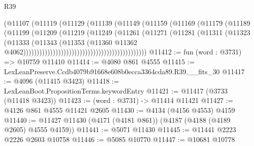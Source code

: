\begin{lexlean}{R39}
\begin{coremodule}
                                                    (@11107
                                                      (@11119
                                                        (@11129
                                                          (@11139
                                                            (@11149
                                                              (@11159
                                                                (@11169
                                                                  (@11179
                                                                    (@11189
                                                                      (@11199
                                                                        (@11209
                                                                          (@11219
                                                                            (@11249
                                                                              (@11261
                                                                                (@11271
                                                                                  (@11281
                                                                                    (@11311
                                                                                      (@11323
                                                                                        (@11333
                                                                                          (@11343
                                                                                            (@11353
                                                                                              (@11360
                                                                                                @11362
                                                                                                @4062))))))))))))))))))))))))))))))))))))))))))))))
@11412 := fun (word : @3731) => @10759 @11410
@11414 := @4080 @861 @4555
@11415 := LexLeanPreserve.Ccdb4079b91668e608b0ecca3364cda89.R39.__fits_30
@11417 := @4096 (@11415 @3423)
@11418 := LexLeanBoot.PropositionTerms.keywordEntry
@11421 := @11417 (@3733 (@11418 @3423))
@11423 := (word : @3731) -> @11414 @11421
@11427 := @4126 @861 @4555 @11421 @2605
@11430 := @4134 (@4156 @4553) @4159
@11440 := @11427 @11430 (@4171 (@4181 @861)) (@4187 (@4188 (@4189 @2605) @4555 @4159))
@11441 := @5071 @11430
@11445 := @11441 @2223 @2226 @2603 @10758
@11446 := @5085 @10770
@11447 := @10681 @10778

\end{coremodule}
\end{lexlean}
